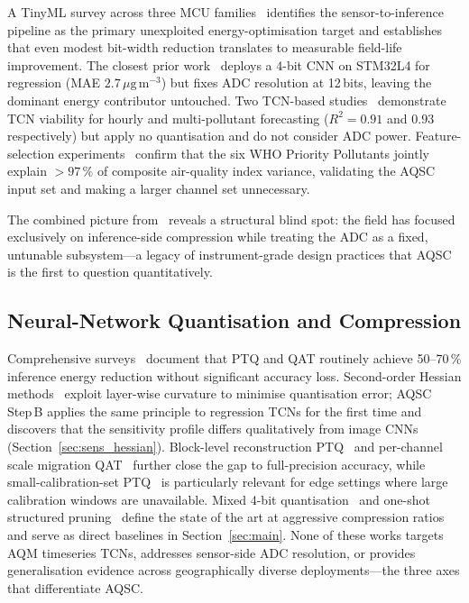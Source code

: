 \documentclass[12pt,a4paper]{article}
\begin{document}
A TinyML survey across three MCU families~\cite{chen2023tinyml}
identifies the sensor-to-inference pipeline as the primary unexploited
energy-optimisation target and establishes that even modest bit-width
reduction translates to measurable field-life improvement.
The closest prior work~\cite{ma2023aqedge} deploys a 4-bit CNN on
STM32L4 for  regression (MAE $2.7\,\mu\mathrm{g\,m^{-3}}$)
but fixes ADC resolution at 12\,bits, leaving the dominant energy
contributor untouched.
Two TCN-based studies~\cite{liang2023tcnaq,yi2024multivar} demonstrate
TCN viability for hourly  and multi-pollutant forecasting
($R^2 = 0.91$ and $0.93$ respectively) but apply no quantisation and
do not consider ADC power.
Feature-selection experiments~\cite{diao2023featuresel} confirm that
the six WHO Priority Pollutants jointly explain $>97\,\%$ of
composite air-quality index variance, validating the AQSC input set
and making a larger channel set unnecessary.

The combined picture from~\cite{chen2023tinyml,ma2023aqedge,liang2023tcnaq,yi2024multivar}
reveals a structural blind spot: the field has focused exclusively on
inference-side compression while treating the ADC as a fixed, untunable
subsystem---a legacy of instrument-grade design practices that AQSC
is the first to question quantitatively.

\subsection{Neural-Network Quantisation and Compression}
\label{sec:rel_quant}

Comprehensive surveys~\cite{menghani2023edl,nagel2021whitepaper}
document that PTQ and QAT routinely achieve 50--70\,\% inference
energy reduction without significant accuracy loss.
Second-order Hessian methods~\cite{frantar2023gptq,dong2021hawqv3}
exploit layer-wise curvature to minimise quantisation error; AQSC
Step\,B applies the same principle to regression TCNs for the first
time and discovers that the sensitivity profile differs qualitatively
from image CNNs (Section~\ref{sec:sens_hessian}).
Block-level reconstruction PTQ~\cite{li2021brecq} and per-channel
scale migration QAT~\cite{xiao2023smoothquant} further close the gap
to full-precision accuracy, while small-calibration-set
PTQ~\cite{hubara2021ptq} is particularly relevant for edge settings
where large calibration windows are unavailable.
Mixed 4-bit quantisation~\cite{dettmers2023qlora} and one-shot
structured pruning~\cite{frantar2023sparsegpt} define the state of
the art at aggressive compression ratios and serve as direct baselines
in Section~\ref{sec:main}.
None of these works targets AQM timeseries TCNs, addresses sensor-side
ADC resolution, or provides generalisation evidence across geographically
diverse deployments---the three axes that differentiate AQSC.
\end{document}
